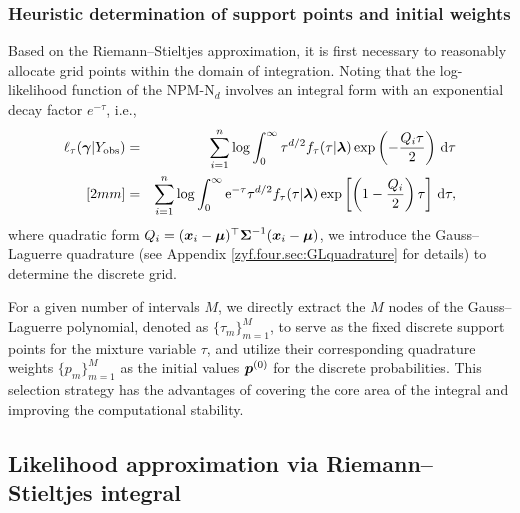 \subsubsection{Heuristic determination of support points and initial weights}        %

Based on the Riemann--Stieltjes approximation, it is first necessary to reasonably allocate grid points within the domain of integration. Noting that the log-likelihood function of the NPM-N$_d$ involves an integral form with an exponential decay factor $e^{-\tau}$, i.e., 
\begin{eqnarray*}
    \ell_\tau({\boldsymbol{\gamma}} | Y_{\rm obs}) &=& \sum_{i=1}^n \log \int_0^\infty \tau^{d / 2} f_\tau(\tau|{\boldsymbol{\lambda}}) \exp\left(-\frac{Q_i\tau}{2}\right) \,\mbox{d} \tau \\ [2mm]
    &=& \sum_{i=1}^n \log \int_0^\infty {\rm e}^{-\tau} \tau^{d / 2} f_\tau(\tau|{\boldsymbol{\lambda}}) \exp\left[\left(1-\frac{Q_i}{2}\right)\tau\right] \,\mbox{d} \tau, 
\end{eqnarray*}
where quadratic form $Q_i = ({\boldsymbol{x}}_i - {\boldsymbol{\mu}})^\top {\mbox{\boldmath$\Sigma$}}^{-1} ({\boldsymbol{x}}_i - {\boldsymbol{\mu}})$, we introduce the Gauss--Laguerre quadrature (see Appendix \ref{zyf.four.sec:GLquadrature} for details) to determine the discrete grid.

For a given number of intervals $M$, we directly extract the $M$ nodes of the Gauss--Laguerre polynomial, denoted as $\{\tau_m\}_{m=1}^M$, to serve as the fixed discrete support points for the mixture variable $\tau$, and utilize their corresponding quadrature weights $\{p_m\}_{m=1}^M$ as the initial values ${\boldsymbol{p}}^{(0)}$ for the discrete probabilities. This selection strategy has the advantages of covering the core area of the integral and improving the computational stability.

\subsection{Likelihood approximation via Riemann--Stieltjes integral}\label{zyf.four.sec:Likelihoodapproximation}     %

